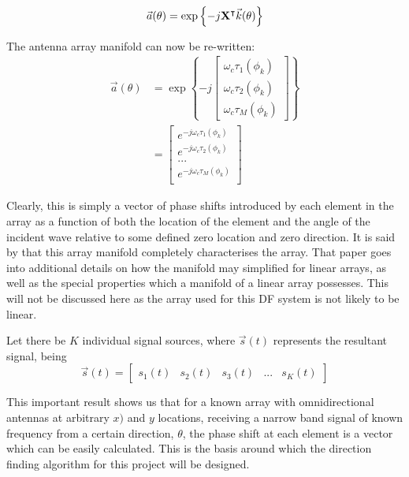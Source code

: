 \begin{equation}
  \vec{a}(\theta) = \exp \left\{ -j \mathbf{X}^\intercal \vec{k}(\theta) \right\}
\end{equation}



The antenna array manifold can now be re-written:
\begin{align}
\vec{a}(\theta) &= 
  \exp \left\{ -j \begin{bmatrix} 
      \omega_c \tau_1(\phi_k)\\ 
      \omega_c \tau_2(\phi_k)\\ 
      \omega_c \tau_M(\phi_k) 
   \end{bmatrix} \right\} \\
  &= \begin{bmatrix}
      e^{-j\omega_c \tau_1(\phi_k)} \\
      e^{-j\omega_c \tau_2(\phi_k)} \\
      ... \\
      e^{-j\omega_c \tau_M(\phi_k)} \\
   \end{bmatrix}
\end{align}

Clearly, this is simply a vector of phase shifts introduced by each element in the array as a function of both the location of the element and the angle of the incident wave relative to some defined zero location and zero direction. It is said by \cite{dacos1995estimating} that this array manifold completely characterises the array. That paper goes into additional details on how the manifold may simplified for linear arrays, as well as the special properties which a manifold of a linear array possesses. This will not be discussed here as the array used for this DF system is not likely to be linear. 

Let there be $K$ individual signal sources, where $\vec{s}(t)$ represents the resultant signal, being
\begin{equation}
\vec{s}(t) = \begin{bmatrix} s_{1}(t) & s_{2}(t) & s_3(t) & ... & s_K(t) \end{bmatrix}
\end{equation}

This important result shows us that for a known array with omnidirectional antennas at arbitrary \(x)\) and \(y\) locations, receiving a narrow band signal of known frequency from a certain direction, \(\theta\), the phase shift at each element is a vector which can be easily calculated. This is the basis around which the direction finding algorithm for this project will be designed. 
